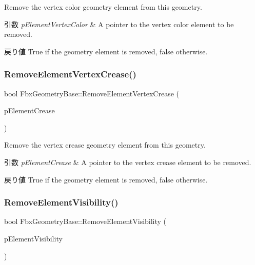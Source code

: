 Remove the vertex color geometry element from this geometry. 
\begin{DoxyParams}{引数}
{\em p\+Element\+Vertex\+Color} & A pointer to the vertex color element to be removed. \\
\hline
\end{DoxyParams}
\begin{DoxyReturn}{戻り値}
{\ttfamily True} if the geometry element is removed, {\ttfamily false} otherwise. 
\end{DoxyReturn}
\mbox{\label{class_fbx_geometry_base_a01fe726448c9362a399148aceb051f71}} 
\subsubsection{\texorpdfstring{Remove\+Element\+Vertex\+Crease()}{RemoveElementVertexCrease()}}
{\footnotesize\ttfamily bool Fbx\+Geometry\+Base\+::\+Remove\+Element\+Vertex\+Crease (\begin{DoxyParamCaption}\item[{\hyperlink{fbxlayer_8h_aa1db71d39153856548f192cf52aa2cc5}{Fbx\+Geometry\+Element\+Crease} $\ast$}]{p\+Element\+Crease }\end{DoxyParamCaption})}

Remove the vertex crease geometry element from this geometry. 
\begin{DoxyParams}{引数}
{\em p\+Element\+Crease} & A pointer to the vertex crease element to be removed. \\
\hline
\end{DoxyParams}
\begin{DoxyReturn}{戻り値}
{\ttfamily True} if the geometry element is removed, {\ttfamily false} otherwise. 
\end{DoxyReturn}
\mbox{\label{class_fbx_geometry_base_a5265ada1a14bc10a5be69719547827b5}} 
\subsubsection{\texorpdfstring{Remove\+Element\+Visibility()}{RemoveElementVisibility()}}
{\footnotesize\ttfamily bool Fbx\+Geometry\+Base\+::\+Remove\+Element\+Visibility (\begin{DoxyParamCaption}\item[{\hyperlink{fbxlayer_8h_a98f6c16a3021e9e04b0352f652eac2a1}{Fbx\+Geometry\+Element\+Visibility} $\ast$}]{p\+Element\+Visibility }\end{DoxyParamCaption})}

